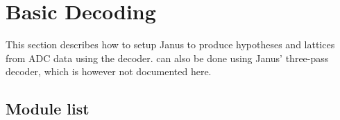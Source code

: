 
\section{Basic Decoding} \label{ibis:basic}

This  section describes how to  setup Janus  to produce hypotheses and
lattices   from      ADC      data     using     the     
decoder.   can also  be done using  Janus' three-pass
decoder, which is however not documented here.

\subsection{Module list}


